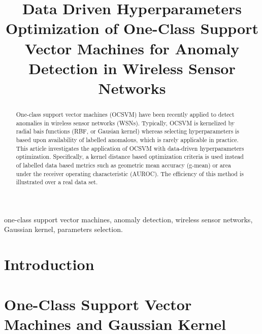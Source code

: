 \documentclass[conference]{IEEEtran}
\theoremstyle{problemstyle}
\begin{document}
\title{Data Driven Hyperparameters Optimization of One-Class Support Vector Machines for Anomaly Detection in Wireless Sensor Networks}

\author{
\and
{}
}

\maketitle

\begin{abstract}
One-class support vector machines (OCSVM) have been recently applied to detect anomalies in wireless sensor networks (WSNs). Typically, OCSVM is kernelized by radial bais functions (RBF, or Gausian kernel) whereas selecting hyperparameters is based upon availability of labelled anomalous, which is rarely applicable in practice. This article investigates the application of OCSVM with data-driven hyperparameters optimization. Specifically, a kernel distance based optimization criteria is used instead of labelled data based metrics such as geometric mean accuracy (g-mean) or area under the receiver operating characteristic (AUROC). The efficiency of this method is illustrated over a real data set. 
\end{abstract}

\begin{IEEEkeywords}
one-class support vector machines,  anomaly detection, wireless sensor networks, Gaussian kernel, parameters selection.
\end{IEEEkeywords}

\IEEEpeerreviewmaketitle

\section{Introduction}

\section{One-Class Support Vector Machines and Gaussian Kernel}\label{sec:OCSVM}
\end{document}
